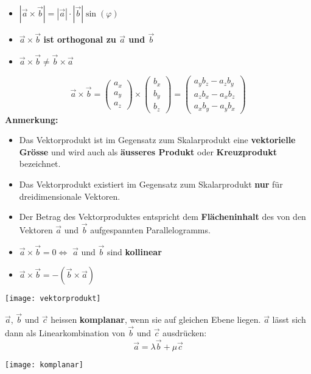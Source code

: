 \begin{itemize}
    \item $|\vec{a} \times \vec{b}| = |\vec{a}| \cdot |\vec{b}| \sin(\varphi)$
    \item $\vec{a} \times \vec{b}$ \textbf{ist orthogonal zu $\vec{a}$ und $\vec{b}$}
    \item $\vec{a} \times \vec{b} \neq \vec{b} \times \vec{a}$
\end{itemize}
\[\vec{a} \times \vec{b} = \left(
\begin{array}{c}
    a_x \\ a_y \\ a_z
\end{array}
\right) \times \left(
\begin{array}{c}
    b_x \\ b_y \\ b_z
\end{array}
\right) = \left(
\begin{array}{c}
    a_y b_z - a_z b_y \\
    a_z b_x - a_x b_z \\
    a_x b_y - a_y b_x
\end{array}
\right)\]
\textbf{Anmerkung:}
\begin{itemize}
    \item Das Vektorprodukt ist im Gegensatz zum Skalarprodukt eine \textbf{vektorielle Grösse} und wird auch als \textbf{äusseres Produkt} oder \textbf{Kreuzprodukt} bezeichnet.
    \item Das Vektorprodukt existiert im Gegensatz zum Skalarprodukt \textbf{nur} für dreidimensionale Vektoren.
    \item Der Betrag des Vektorproduktes entspricht dem \textbf{Flächeninhalt} des von den Vektoren $\vec{a}$ und $\vec{b}$ aufgespannten Parallelogramms.
    \item $\vec{a} \times \vec{b} = 0 \Leftrightarrow$ $\vec{a}$ und $\vec{b}$ sind \textbf{kollinear}
    \item $\vec{a} \times \vec{b} = -(\vec{b} \times \vec{a})$
\end{itemize}
\texttt{[image: vektorprodukt]}


$\vec{a}$, $\vec{b}$ und $\vec{c}$ heissen \textbf{komplanar}, wenn sie auf gleichen Ebene liegen.
$\vec{a}$ lässt sich dann als Linearkombination von $\vec{b}$ und $\vec{c}$ ausdrücken:
\[\vec{a} = \lambda \vec{b} + \mu \vec{c}\]

\begin{center}
    \texttt{[image: komplanar]}
\end{center}

